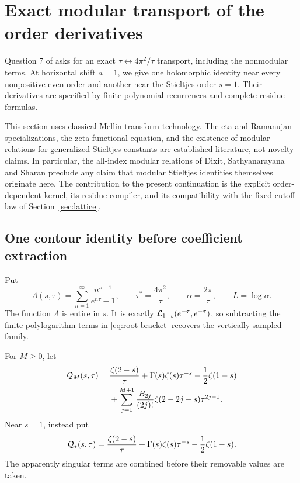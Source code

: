 \section{Exact modular transport of the order derivatives}
\label{sec:modular}

Question 7 of \cite{RepoVertical} asks for an exact
\(\tau\leftrightarrow4\pi^2/\tau\) transport, including the
nonmodular terms. At horizontal shift \(a=1\), we give one
holomorphic identity near every nonpositive even order and another
near the Stieltjes order \(s=1\). Their derivatives are specified
by finite polynomial recurrences and complete residue formulas.

This section uses classical Mellin-transform technology. The eta
and Ramanujan specializations, the zeta functional equation, and
the existence of modular relations for generalized Stieltjes
constants are established literature, not novelty claims.
In particular, the all-index modular relations of Dixit,
Sathyanarayana and Sharan \cite{DixitStieltjes} preclude any claim
that modular Stieltjes identities themselves originate here.
The contribution to the present continuation is the explicit
order-dependent kernel, its residue compiler, and its compatibility
with the fixed-cutoff law of Section~\ref{sec:lattice}.

\subsection{One contour identity before coefficient extraction}

Put
\begin{equation}\label{eq:mod-lambda}
 \Lambda(s,\tau)=\sum_{n=1}^{\infty}
       \frac{n^{s-1}}{e^{n\tau}-1},\qquad
 \tau^*=\frac{4\pi^2}{\tau},\qquad
 \alpha=\frac{2\pi}{\tau},\qquad L=\log\alpha.
\end{equation}
The function \(\Lambda\) is entire in \(s\). It is exactly
\({\cal L}_{1-s}(e^{-\tau},e^{-\tau})\), so subtracting the
finite polylogarithm terms in \eqref{eq:root-bracket} recovers
the vertically sampled family.

For \(M\geq0\), let
\begin{align}
 {\cal Q}_M(s,\tau)
  ={}&\frac{\zeta(2-s)}{\tau}
   +\Gamma(s)\zeta(s)\tau^{-s}-\frac12\zeta(1-s)\notag\\
 &+\sum_{j=1}^{M+1}\frac{B_{2j}}{(2j)!}
          \zeta(2-2j-s)\tau^{2j-1}.
 \label{eq:mod-residue-even}
\end{align}
Near \(s=1\), instead put
\begin{equation}\label{eq:mod-residue-one}
 {\cal Q}_*(s,\tau)=
   \frac{\zeta(2-s)}{\tau}
   +\Gamma(s)\zeta(s)\tau^{-s}-\frac12\zeta(1-s).
\end{equation}
The apparently singular terms are combined before their removable
values are taken.

